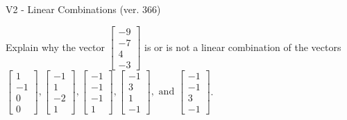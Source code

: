 \begin{exercise}
  \begin{exerciseTitle}V2 - Linear Combinations (ver. 366)\end{exerciseTitle}
  \begin{exerciseStatement}
    Explain why the vector \(\left[\begin{array}{c}
-9 \\
-7 \\
4 \\
-3
\end{array}\right]\)  is or is not a linear 
	combination of the vectors \(\left[\begin{array}{c}
1 \\
-1 \\
0 \\
0
\end{array}\right] , \left[\begin{array}{c}
-1 \\
1 \\
-2 \\
1
\end{array}\right] , \left[\begin{array}{c}
-1 \\
-1 \\
-1 \\
1
\end{array}\right] , \left[\begin{array}{c}
-1 \\
3 \\
1 \\
-1
\end{array}\right] , \text{ and } \left[\begin{array}{c}
-1 \\
-1 \\
3 \\
-1
\end{array}\right]\).
	



\end{exerciseStatement}
\end{exercise}
